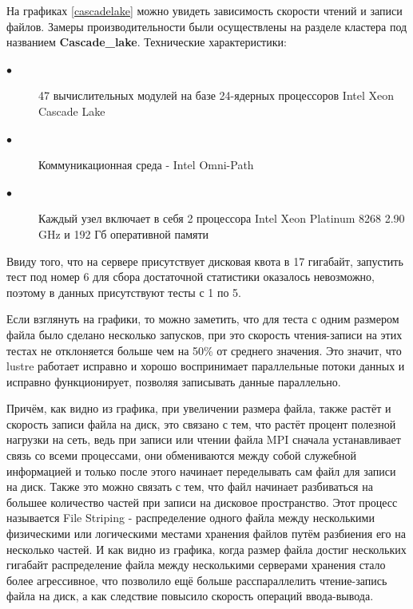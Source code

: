 На графиках \ref{cascadelake} можно увидеть зависимость скорости чтений и записи файлов. Замеры производительности
были осуществлены на разделе кластера под названием \textbf{Cascade\_lake}. Технические характеристики:
\begin{description}
    \item[$\bullet$] 47 вычислительных модулей на базе 24-ядерных процессоров Intel Xeon Cascade Lake
    \item[$\bullet$] Коммуникационная среда - Intel Omni-Path
    \item[$\bullet$] Каждый узел включает в себя 2 процессора Intel Xeon Platinum 8268 2.90 GHz и 192 Гб
    оперативной памяти
\end{description}

Ввиду того, что на сервере присутствует дисковая квота в 17 гигабайт, запустить тест под номер 6 для сбора достаточной статистики оказалось невозможно, поэтому в данных присутствуют тесты с 1 по 5.

Если взглянуть на графики, то можно заметить, что для теста с одним размером файла было сделано несколько
запусков, при это скорость чтения-записи на этих тестах не отклоняется больше чем на 50\% от среднего
значения. Это значит, что lustre работает исправно и хорошо воспринимает параллельные потоки данных и
исправно функционирует, позволяя записывать данные параллельно.

Причём, как видно из графика, при увеличении размера файла, также растёт и скорость записи файла на диск,
это связано с тем, что растёт процент полезной нагрузки на сеть, ведь при записи или чтении файла MPI
сначала устанавливает связь со всеми процессами, они обмениваются между собой служебной информацией и
только после этого начинает переделывать сам файл для записи на диск. Также это можно связать с тем, что
файл начинает разбиваться на большее количество частей при записи на дисковое пространство. Этот процесс
называется File Striping - распределение одного файла между несколькими физическими или логическими
местами хранения файлов путём разбиения его на несколько частей. И как видно из графика, когда размер
файла достиг нескольких гигабайт распределение файла между несколькими серверами хранения стало более
агрессивное, что позволило ещё больше расспараллелить чтение-запись файла на диск, а как следствие
повысило скорость операций ввода-вывода.

